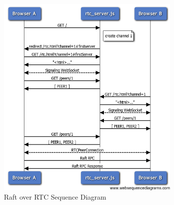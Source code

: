 \documentclass[9pt]{extarticle}
\begin{document}

\begin{figure}[h]
\centerline{\includegraphics[width=0.8\textwidth]{imgs/raft_rtc_sequence}}
\caption{Raft over RTC Sequence Diagram}
  \label{fig:raft_rtc_sequence}
\end{figure}
\end{document}
